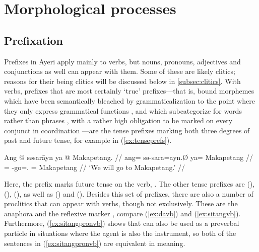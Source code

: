 \section{Morphological processes}

\subsection{Prefixation}

Prefixes in Ayeri apply mainly to verbs, but nouns, pronouns, adjectives and
conjunctions as well can appear with them. Some of these are likely clitics;
reasons for their being clitics will be discussed below in
\autoref{subsec:clitics}. With verbs, prefixes that are most certainly `true'
prefixes---that is, bound morphemes which have been semantically bleached by
grammaticalization to the point where they only express grammatical functions
\citep[157\psqq]{lehmann2015}, and which subcategorize for words rather than
phrases \citep[117]{klavans1985}, with a rather high obligation to be marked on
every conjunct in coordination \citep[139]{spencerluis2012}---are the tense
prefixes marking both three degrees of past and future tense, for example
 in (\ref{ex:tenseprefs}).

\ex\label{ex:tenseprefs}
\begingl
	\gla Ang @ səsarāyn ya @ Makapetang. //
	\glb ang= sə-sara=ayn.Ø ya= Makapetang //
	\glc \AgtT{}= \Fut{}-go=\Fpl{}.\Top{} \Loc{}= Makapetang //
	\glft `We will go to Makapetang.' //
\endgl\xe

Here, the prefix  marks future tense on the verb, 
. The other tense prefixes are 
  (\NPst{}),  (\Pst{}),  (\RPst{}),
as well as  (\NFut{}) and  (\RFut{}). Besides this
set of prefixes, there are also a number of proclitics that can appear with
verbs, though not exclusively. These are the anaphora  and the reflexive marker
, compare (\ref{ex:davb}) and (\ref{ex:sitangvb}).
Furthermore, (\ref{ex:sitangpronvb}) shows that  can also
be used as a preverbal particle in situations where the agent is also the
instrument, so both of the sentences in (\ref{ex:sitangpronvb}) are equivalent in meaning.

